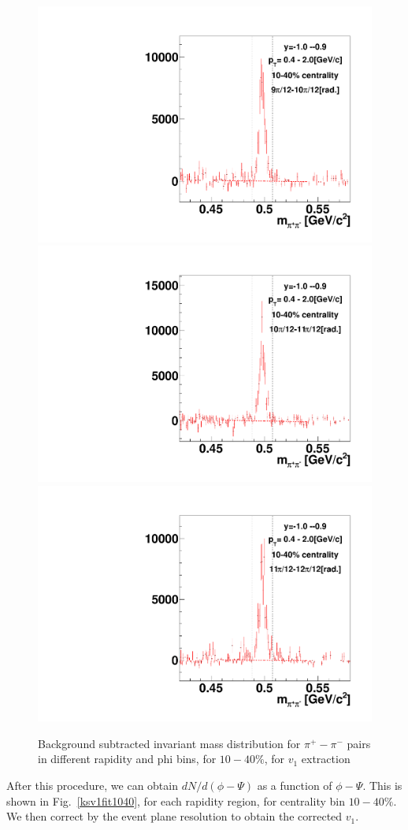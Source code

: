 \begin{figure}[h]
\includegraphics[width=0.14\linewidth]{chapterX/fig/ks_v1_sig/kf_ptslice0_cent1_ks_flow_phi10_rap14.pdf}
\includegraphics[width=0.14\linewidth]{chapterX/fig/ks_v1_sig/kf_ptslice0_cent1_ks_flow_phi11_rap14.pdf}
\includegraphics[width=0.14\linewidth]{chapterX/fig/ks_v1_sig/kf_ptslice0_cent1_ks_flow_phi12_rap14.pdf}

\caption{Background subtracted invariant mass distribution for $\pi^{+}-\pi^{-}$ pairs in different rapidity and phi bins, for $10-40\%$, for $v_{1}$ extraction}
\label{ks_v1_sig3}
\end{figure}

After this procedure, we can obtain $dN/d(\phi-\Psi)$ as a function of $\phi-\Psi$. This is shown in Fig.~\ref{ksv1fit1040}, for each rapidity region, for centrality bin $10-40\%$. We then correct by the event plane resolution to obtain the corrected $v_{1}$. 

